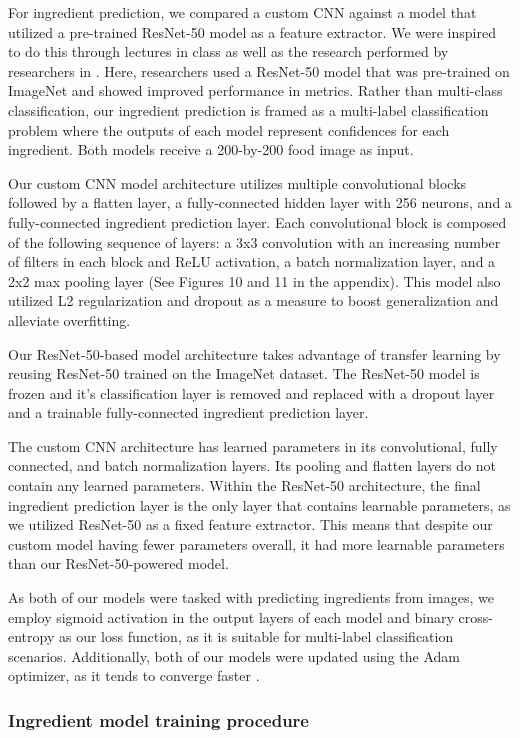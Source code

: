 \documentclass[10pt,twocolumn,letterpaper]{article}
\begin{document}
For ingredient prediction, we compared a custom CNN against a model that utilized a pre-trained ResNet-50 model as a feature extractor. We were inspired to do this through lectures in class as well as the research performed by researchers in \cite{recipe1707}. Here, researchers used a ResNet-50 model that was pre-trained on ImageNet and showed improved performance in metrics. Rather than multi-class classification, our ingredient prediction is framed as a multi-label classification problem where the outputs of each model represent confidences for each ingredient. Both models receive a 200-by-200 food image as input.

Our custom CNN model architecture utilizes multiple convolutional blocks followed by a flatten layer, a fully-connected hidden layer with 256 neurons, and a fully-connected ingredient prediction layer. Each convolutional block is composed of the following sequence of layers: a 3x3 convolution with an increasing number of filters in each block and ReLU activation, a batch normalization layer, and a 2x2 max pooling layer (See Figures 10 and 11 in the appendix). This model also utilized L2 regularization and dropout as a measure to boost generalization and alleviate overfitting.

Our ResNet-50-based model architecture takes advantage of transfer learning by reusing ResNet-50 trained on the ImageNet dataset. The ResNet-50 model is frozen and it's classification layer is removed and replaced with a dropout layer and a trainable fully-connected ingredient prediction layer.

The custom CNN architecture has learned parameters in its convolutional, fully connected, and batch normalization layers. Its pooling and flatten layers do not contain any learned parameters. Within the ResNet-50 architecture, the final ingredient prediction layer is the only layer that contains learnable parameters, as we utilized ResNet-50 as a fixed feature extractor. This means that despite our custom model having fewer parameters overall, it had more learnable parameters than our ResNet-50-powered model.

As both of our models were tasked with predicting ingredients from images, we employ sigmoid activation in the output layers of each model and binary cross-entropy as our loss function, as it is suitable for multi-label classification scenarios. Additionally, both of our models were updated using the Adam optimizer, as it tends to converge faster \cite{kingma2017adam}.

\subsubsection{Ingredient model training procedure}
\end{document}
